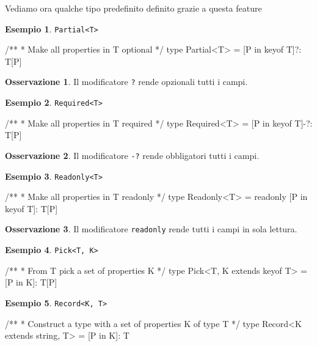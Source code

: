 \documentclass[12pt]{article}
\theoremstyle{definition}
\newtheorem{example}{Esempio}[subsection]
\newtheorem{observation}{Osservazione}[subsection]
\newenvironment{code}
  {\vspace{0.5cm} \VerbatimEnvironment\begin{typescriptcode}}
  {\end{typescriptcode} \vspace{0.2cm}}
\begin{document}
Vediamo ora qualche tipo predefinito definito grazie a questa feature

\begin{example}
\texttt{Partial<T>}

\begin{code}
/**
 * Make all properties in T optional
 */
type Partial<T> = { [P in keyof T]?: T[P] }
\end{code}
\end{example}

\begin{observation}
Il modificatore \texttt{?} rende opzionali tutti i campi.
\end{observation}

\begin{example}
\texttt{Required<T>}

\begin{code}
/**
 * Make all properties in T required
 */
type Required<T> = { [P in keyof T]-?: T[P] }
\end{code}
\end{example}

\begin{observation}
Il modificatore \texttt{-?} rende obbligatori tutti i campi.
\end{observation}

\begin{example}
\texttt{Readonly<T>}

\begin{code}
/**
* Make all properties in T readonly
*/
type Readonly<T> = { readonly [P in keyof T]: T[P] }
\end{code}
\end{example}

\begin{observation}
Il modificatore \texttt{readonly} rende tutti i campi in sola lettura.
\end{observation}

\begin{example}
\texttt{Pick<T, K>}

\begin{code}
/**
* From T pick a set of properties K
*/
type Pick<T, K extends keyof T> = { [P in K]: T[P] }
\end{code}
\end{example}

\begin{example}
\texttt{Record<K, T>}

\begin{code}
/**
 * Construct a type with a set of properties K of type T
 */
type Record<K extends string, T> = { [P in K]: T }
\end{code}
\end{example}
\end{document}
